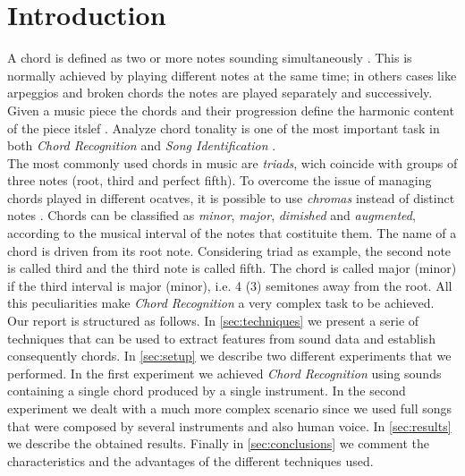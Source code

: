 \section{Introduction}
\label{sec:intro}

A chord is defined as two or more notes sounding simultaneously \cite{benward2014music}. This is normally achieved by playing different notes at the same time; in others cases like arpeggios and broken chords the notes are played separately and successively. Given a music piece the chords and their progression define the harmonic content of the piece itslef \cite{papadopoulos2007large}. Analyze chord tonality is one of the most important task in both \textit{Chord Recognition} and \textit{Song Identification} \cite{lee2006identifying}.\\
%
The most commonly used chords in music are \textit{triads}, wich coincide with groups of three notes (root, third and perfect fifth). To overcome the issue of managing chords played in different ocatves, it is possible to use \textit{chromas} instead of distinct notes \cite{bartsch2005audio}. Chords can be classified as \textit{minor}, \textit{major}, \textit{dimished} and \textit{augmented}, according to the musical interval of the notes that costituite them. The name of a chord is driven from its root note. Considering triad as example, the second note is called third and the third note is called fifth. The chord is called major (minor) if the third interval is major (minor), i.e. 4 (3) semitones away from the root. All this peculiarities make \textit{Chord Recognition} a very complex task to be achieved. \\
%
Our report is structured as follows. In \ref{sec:techniques} we present a serie of techniques that can be used to extract features from sound data and establish consequently chords. In \ref{sec:setup} we describe two different experiments that we performed. In the first experiment we achieved \textit{Chord Recognition} using sounds containing a single chord produced by a single instrument. In the second experiment we dealt with a much more complex scenario since we used full songs that were composed by several instruments and also human voice. In \ref{sec:results} we describe the obtained results. Finally in \ref{sec:conclusions} we comment the characteristics and the advantages of the different techniques used. 
